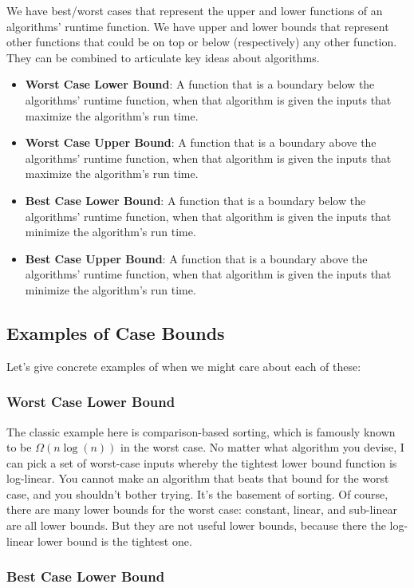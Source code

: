 \documentclass[en,hazy,blue,screen,14pt]{elegantnote}
\begin{document}
We have best/worst cases that represent the upper and lower functions
of an algorithms' runtime function. We have upper and lower bounds
that represent other functions that could be on top or below (respectively)
any other function. They can be combined to articulate key ideas about
algorithms.
\begin{itemize}
\item \textbf{Worst Case Lower Bound}: A function that is a boundary below
the algorithms' runtime function, when that algorithm is given the
inputs that maximize the algorithm's run time.
\item \textbf{Worst Case Upper Bound}: A function that is a boundary above
the algorithms' runtime function, when that algorithm is given the
inputs that maximize the algorithm's run time.
\item \textbf{Best Case Lower Bound}: A function that is a boundary below
the algorithms' runtime function, when that algorithm is given the
inputs that minimize the algorithm's run time.
\item \textbf{Best Case Upper Bound}: A function that is a boundary above
the algorithms' runtime function, when that algorithm is given the
inputs that minimize the algorithm's run time.
\end{itemize}

\subsection{Examples of Case Bounds}

Let's give concrete examples of when we might care about each of these:

\subsubsection*{Worst Case Lower Bound}

The classic example here is comparison-based sorting, which is famously
known to be $\Omega(n\log(n))$ in the worst case. No matter what
algorithm you devise, I can pick a set of worst-case inputs whereby
the tightest lower bound function is log-linear. You cannot make an
algorithm that beats that bound for the worst case, and you shouldn't
bother trying. It's the basement of sorting. Of course, there are
many lower bounds for the worst case: constant, linear, and sub-linear
are all lower bounds. But they are not useful lower bounds, because
there the log-linear lower bound is the tightest one.

\subsubsection*{Best Case Lower Bound}
\end{document}
